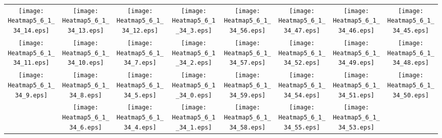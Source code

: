 \documentclass{standalone}
\begin{document}
\begin{tabular}{ *8{c} }
\texttt{[image: Heatmap5\_6\_1\_34\_14.eps]} & \texttt{[image: Heatmap5\_6\_1\_34\_13.eps]} & \texttt{[image: Heatmap5\_6\_1\_34\_12.eps]} & \texttt{[image: Heatmap5\_6\_1\_34\_3.eps]} & \texttt{[image: Heatmap5\_6\_1\_34\_56.eps]} & \texttt{[image: Heatmap5\_6\_1\_34\_47.eps]} & \texttt{[image: Heatmap5\_6\_1\_34\_46.eps]} & \texttt{[image: Heatmap5\_6\_1\_34\_45.eps]} \\
\texttt{[image: Heatmap5\_6\_1\_34\_11.eps]} & \texttt{[image: Heatmap5\_6\_1\_34\_10.eps]} & \texttt{[image: Heatmap5\_6\_1\_34\_7.eps]} & \texttt{[image: Heatmap5\_6\_1\_34\_2.eps]} & \texttt{[image: Heatmap5\_6\_1\_34\_57.eps]} & \texttt{[image: Heatmap5\_6\_1\_34\_52.eps]} & \texttt{[image: Heatmap5\_6\_1\_34\_49.eps]} & \texttt{[image: Heatmap5\_6\_1\_34\_48.eps]} \\
\texttt{[image: Heatmap5\_6\_1\_34\_9.eps]} & \texttt{[image: Heatmap5\_6\_1\_34\_8.eps]} & \texttt{[image: Heatmap5\_6\_1\_34\_5.eps]} & \texttt{[image: Heatmap5\_6\_1\_34\_0.eps]} & \texttt{[image: Heatmap5\_6\_1\_34\_59.eps]} & \texttt{[image: Heatmap5\_6\_1\_34\_54.eps]} & \texttt{[image: Heatmap5\_6\_1\_34\_51.eps]} & \texttt{[image: Heatmap5\_6\_1\_34\_50.eps]} \\
 & \texttt{[image: Heatmap5\_6\_1\_34\_6.eps]} & \texttt{[image: Heatmap5\_6\_1\_34\_4.eps]} & \texttt{[image: Heatmap5\_6\_1\_34\_1.eps]} & \texttt{[image: Heatmap5\_6\_1\_34\_58.eps]} & \texttt{[image: Heatmap5\_6\_1\_34\_55.eps]} & \texttt{[image: Heatmap5\_6\_1\_34\_53.eps]} &  
\end{tabular}
\end{document}
